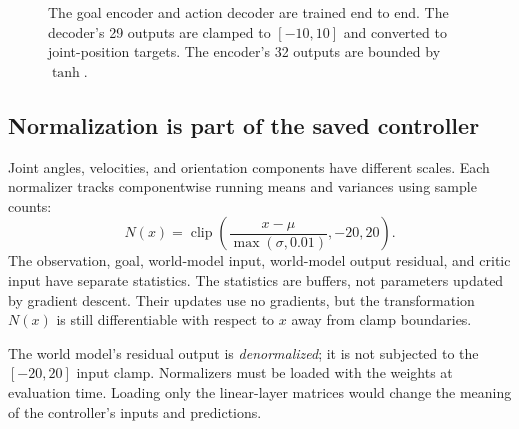 \documentclass[11pt,a4paper]{article}
\newcommand{\clip}{\operatorname{clip}}
\begin{document}
\begin{figure}[htbp]
\centering
{}
\caption{The goal encoder and action decoder are trained end to end. The
decoder's 29 outputs are clamped to $[-10,10]$ and converted to joint-position
targets. The encoder's 32 outputs are bounded by $\tanh$.}
\end{figure}

\subsection{Normalization is part of the saved controller}
Joint angles, velocities, and orientation components have different scales. Each
normalizer tracks componentwise running means and variances using sample counts:
\begin{equation}
N(x)=\clip\left(\frac{x-\mu}{\max(\sigma,0.01)},-20,20\right).
\end{equation}
The observation, goal, world-model input, world-model output residual, and critic
input have separate statistics. The statistics are buffers, not parameters
updated by gradient descent. Their updates use no gradients, but the transformation
$N(x)$ is still differentiable with respect to $x$ away from clamp boundaries.

The world model's residual output is \emph{denormalized}; it is not subjected to
the $[-20,20]$ input clamp. Normalizers must be loaded with the weights at
evaluation time. Loading only the linear-layer matrices would change the meaning
of the controller's inputs and predictions.
\end{document}

